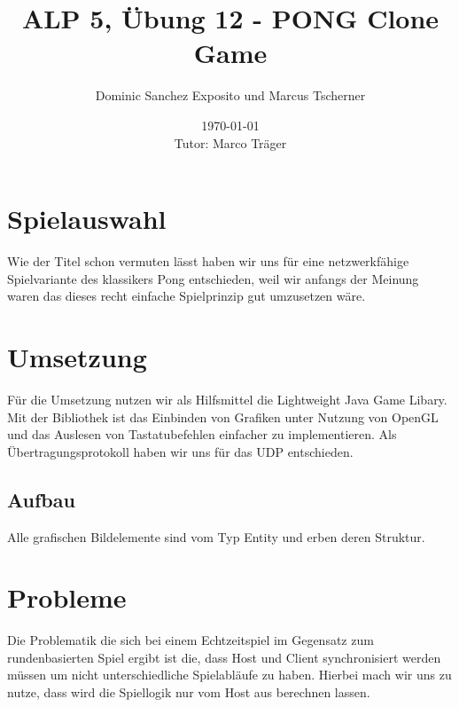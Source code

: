 \documentclass[a4paper,12pt]{article}
\begin{document}
\title{ALP 5, Übung 12 - PONG Clone Game}
\author{Dominic Sanchez Exposito und Marcus Tscherner}
\date{\today\\[3pt]
Tutor: Marco Träger}
\maketitle
\tableofcontents

\section{Spielauswahl}
Wie der Titel schon vermuten lässt haben wir uns für eine netzwerkfähige Spielvariante des klassikers Pong entschieden, weil wir anfangs der Meinung waren das dieses recht einfache Spielprinzip gut umzusetzen wäre. 
\section{Umsetzung}
Für die Umsetzung nutzen wir als Hilfsmittel die Lightweight Java Game Libary. Mit der Bibliothek ist das Einbinden von Grafiken unter Nutzung von OpenGL und das Auslesen von Tastatubefehlen einfacher zu implementieren. Als Übertragungsprotokoll haben wir uns für das UDP entschieden.
\subsection{Aufbau}
Alle grafischen Bildelemente sind vom Typ Entity und erben deren Struktur.
\section{Probleme}
Die Problematik die sich bei einem Echtzeitspiel im Gegensatz zum rundenbasierten Spiel ergibt ist die, dass Host und Client synchronisiert werden müssen um nicht unterschiedliche Spielabläufe zu haben. Hierbei mach wir uns zu nutze, dass wird die Spiellogik nur vom Host aus berechnen lassen.
\end{document}

